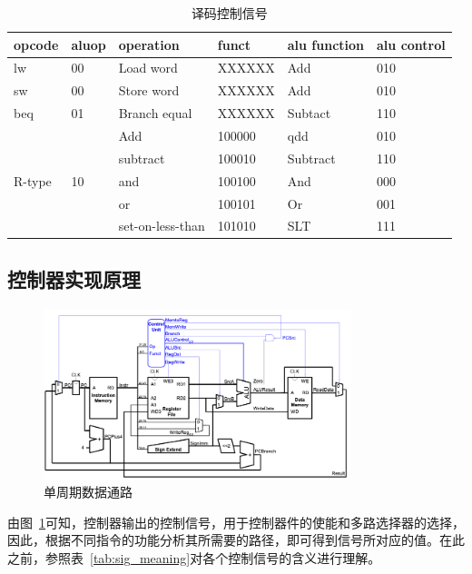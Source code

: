 \begin{table}[htbp]
    \centering
    \begin{tabular}{l|l|l|l|l|l}
        opcode&	aluop&	operation&	funct&	alu function	&alu control \\ \hline
        lw  &	00&	    Load word   &	XXXXXX&	Add&	010 \\ \hline
        sw  &	00&     Store word  &	XXXXXX&	Add&	010 \\ \hline
        beq &	01&	    Branch equal&	XXXXXX&	Subtact&	110 \\ \hline
        \multirow{5}{*}{R-type}& \multirow{5}{*}{10}&	Add&	100000&	qdd&	010 \\
		&   &   subtract        &	100010  &	Subtract&	110 \\
		&   &   and	            &   100100	&   And     &	000 \\
		&   &   or              &	100101  &	Or      &	001 \\
		&   &   set-on-less-than&	101010  &	SLT	    &   111 \\ \hline
    \end{tabular}
    \caption{译码控制信号}
    \label{tab:decode_sig}
\end{table}

\subsection{控制器实现原理}
\begin{figure}[htbp]
    \centering
    \includegraphics[width = 0.8\textwidth]{image/3_section/data_path.png}
    \caption{单周期数据通路}
    \label{fig:data_path}
\end{figure}
由图~\ref{fig:data_path}可知，控制器输出的控制信号，用于控制器件的使能和多路选择器的选择，因此，根据不同指令的功能分析其所需要的路径，即可得到信号所对应的值。在此之前，参照表~\ref{tab:sig_meaning}对各个控制信号的含义进行理解。


